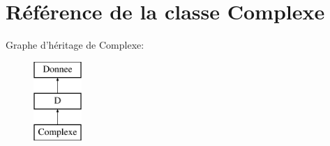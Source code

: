 \hypertarget{class_complexe}{\section{Référence de la classe Complexe}
\label{class_complexe}
}
Graphe d'héritage de Complexe\-:\begin{figure}[H]
\begin{center}
\leavevmode
\includegraphics[height=3.000000cm]{class_complexe}
\end{center}
\end{figure}
